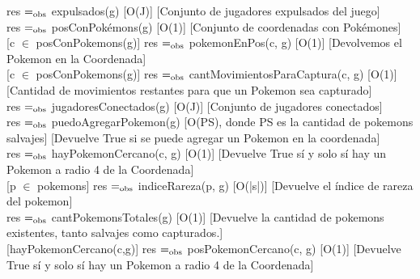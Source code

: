{res $=_{\mathrm{obs}}$ expulsados(g)}
[O(J)]
[Conjunto de jugadores expulsados del juego]
\\

{res $=_{\mathrm{obs}}$ posConPok\'emons(g)}
[O(1)]
[Conjunto de coordenadas con Pok\'emones]
\\

[c $\in$ posConPokemons(g)]
{res $=_{\mathrm{obs}}$ pokemonEnPos(c, g)}
[O(1)]
[Devolvemos el Pokemon en la Coordenada]
\\

[c $\in$ posConPokemons(g)]
{res $=_{\mathrm{obs}}$ cantMovimientosParaCaptura(c, g)}
[O(1)]
[Cantidad de movimientos restantes para que un Pokemon sea capturado]
\\


{res $=_{\mathrm{obs}}$ jugadoresConectados(g)}
[O(J)]
[Conjunto de jugadores conectados]
\\

{res $=_{\mathrm{obs}}$ puedoAgregarPokemon(g)}
[O(PS), donde PS es la cantidad de pokemons salvajes]
[Devuelve True si se puede agregar un Pokemon en la coordenada]
\\

{res $=_{\mathrm{obs}}$ hayPokemonCercano(c, g)}
[O(1)]
[Devuelve True s\'i y solo s\'i hay un Pokemon a radio 4 de la Coordenada]
\\

[p $\in$ pokemons]
{res $=_{\mathrm{obs}}$ indiceRareza(p, g)}
[O(|s|)]
[Devuelve el índice de rareza del pokemon]
\\

{res $=_{\mathrm{obs}}$ cantPokemonsTotales(g)}
[O(1)]
[Devuelve la cantidad de pokemons existentes, tanto salvajes como capturados.]
\\

[hayPokemonCercano(c,g)]
{res $=_{\mathrm{obs}}$ posPokemonCercano(c, g)}
[O(1)]
[Devuelve True s\'i y solo s\'i hay un Pokemon a radio 4 de la Coordenada]




